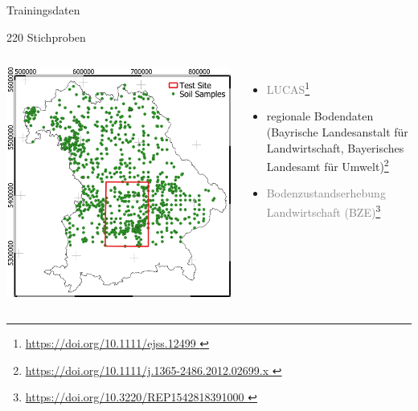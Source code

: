 \begin{frame}{Trainingsdaten}
\begin{block}{220 Stichproben}
\begin{columns}
\column{5cm}
\centering\includegraphics[width=1\textwidth]{FIGURE/Figure_TestSite.png}
\column{6.5cm}
\begin{itemize}
    \item \textcolor{gray}{LUCAS\footnote{\tiny{\url{https://doi.org/10.1111/ejss.12499     }}}}
    \item regionale Bodendaten (Bayrische Landesanstalt für Landwirtschaft, Bayerisches Landesamt für Umwelt)\footnote{\tiny{\url{ https://doi.org/10.1111/j.1365-2486.2012.02699.x               }}}
    \item \textcolor{gray}{Bodenzustandserhebung Landwirtschaft (BZE)}\footnote{\tiny{\url{https://doi.org/10.3220/REP1542818391000              }}}
\end{itemize}
\end{columns}
\end{block}
\end{frame}


